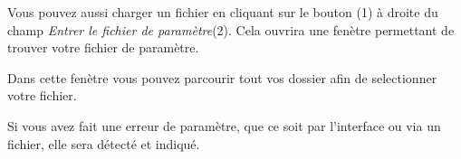 \documentclass[a4paper,11pt]{article}
\begin{document}
\vspace{1.2cm}

Vous pouvez aussi charger un fichier en cliquant sur le bouton (1) à droite du champ \textit{Entrer le fichier de paramètre}(2). Cela ouvrira une fenètre permettant de trouver votre fichier de paramètre.\\

\vspace{2.5cm}

Dans cette fenètre vous pouvez parcourir tout vos dossier afin de selectionner votre fichier.\\

\vspace{3.5cm}

Si vous avez fait une erreur de paramètre, que ce soit par l'interface ou via un fichier, elle sera détecté et indiqué.\\
\end{document}
